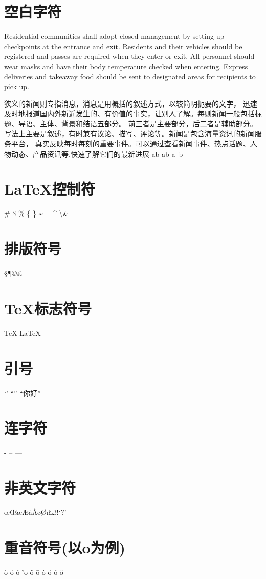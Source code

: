 \documentclass{article}
\begin{document}
    \section{空白字符}
    Residential communities shall adopt closed management 
    by setting up checkpoints at the entrance and exit. Residents and 
    their vehicles should be registered and passes are required when they 
    enter or exit. All personnel should wear masks and have their body 
    temperature checked when entering. Express deliveries and takeaway food 
    should be sent to designated areas for recipients to pick up.


    狭\quad 义的新闻则专指消息，消息是用概括的叙述方式，以较简明扼要的文字，
    迅速及时地报道国内外新近发生的、有价值的事实，让别人了解。每则新闻一般包括标题、导语、主体、背景和结语五部分。
    前三者是主要部分，后二者是辅助部分。写法上主要是叙述，有时兼有议论、描写、评论等。新闻是包含海量资讯的新闻服务平台，
    真实反映每时每刻的重要事件。可以通过查看新闻事件、热点话题、人物动态、产品资讯等,快速了解它们的最新进展
    a\quad b
    a\qquad b
    a~b

    \section{\LaTeX 控制符}
    \# \$ \% \{ \} \~{} \_{} \^{} \textbackslash \&

    \section{排版符号}
    \S \P \dag \ddag \copyright \pounds

    \section{\TeX 标志符号}
    \TeX{} \LaTeX{} \LaTeXe{}
    \XeLaTeX


    \section{引号}
    `' ``''  ``你好''

    \section{连字符}
    - -- ---

    \section{非英文字符}
    \oe \OE \ae \AE \aa \AA \o \O \i \L \SS \ss !`?'

    \section{重音符号(以o为例)}
    \`o \'o  \^o \''o \~o \=o \.o \u{o} \v{o} \H{o}
\end{document}
